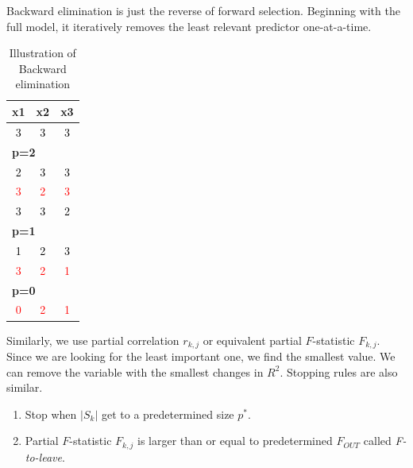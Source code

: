 \documentclass[]{book}
\providecommand{\tightlist}{%
  \setlength{\itemsep}{0pt}\setlength{\parskip}{0pt}}
\theoremstyle{definition}
\theoremstyle{definition}
\theoremstyle{definition}
\theoremstyle{remark}
\begin{document}
Backward elimination is just the reverse of forward selection. Beginning with the full model, it iteratively removes the least relevant predictor one-at-a-time.

\begin{longtable}{c|c|c}
\caption{\label{tab:bwtab}Illustration of Backward elimination}\\
\hline
x1 & x2 & x3\\
\hline
\textcolor{black}{3} & \textcolor{black}{3} & \textcolor{black}{3}\\
\hline
\multicolumn{3}{l}{\textbf{p=2}}\\
\hline
\hspace{1em}\textcolor{black}{2} & \textcolor{black}{3} & \textcolor{black}{3}\\
\hline
\hspace{1em}\textcolor{red}{3} & \textcolor{red}{2} & \textcolor{red}{3}\\
\hline
\hspace{1em}\textcolor{black}{3} & \textcolor{black}{3} & \textcolor{black}{2}\\
\hline
\multicolumn{3}{l}{\textbf{p=1}}\\
\hline
\hspace{1em}\textcolor{black}{1} & \textcolor{black}{2} & \textcolor{black}{3}\\
\hline
\hspace{1em}\textcolor{red}{3} & \textcolor{red}{2} & \textcolor{red}{1}\\
\hline
\multicolumn{3}{l}{\textbf{p=0}}\\
\hline
\hspace{1em}\textcolor{red}{0} & \textcolor{red}{2} & \textcolor{red}{1}\\
\hline
\end{longtable}

Similarly, we use partial correlation \(r_{k,j}\) or equivalent partial \(F\)-statistic \(F_{k,j}\). Since we are looking for the least important one, we find the smallest value. We can remove the variable with the smallest changes in \(R^2\). Stopping rules are also similar.

\begin{enumerate}
\def\labelenumi{\arabic{enumi}.}
\tightlist
\item
  Stop when \(\lvert S_k \rvert\) get to a predetermined size \(p^{\ast}\).
\item
  Partial \(F\)-statistic \(F_{k,j}\) is larger than or equal to predetermined \(F_{OUT}\) called \emph{F-to-leave}.
\end{enumerate}
\end{document}
